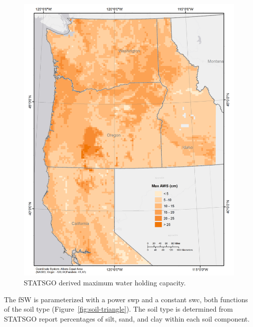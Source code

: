 \documentclass[preprint,review,12pt]{elsarticle}
\begin{document}
\begin{figure}
  \centering
\includegraphics[width=1\linewidth]{maxaws}
  \caption{\ac{STATSGO} derived maximum water holding capacity.}
  \label{fig:aws}
\end{figure}

The \ac{fSW} is parameterized with a power \acs{swp} and a constant
\acs{swc}, both functions of the soil type
(Figure~\ref{fig:soil-triangle}).  The soil type is determined from
\ac{STATSGO} report percentages of silt, sand, and clay within each
soil component.

\end{document}
